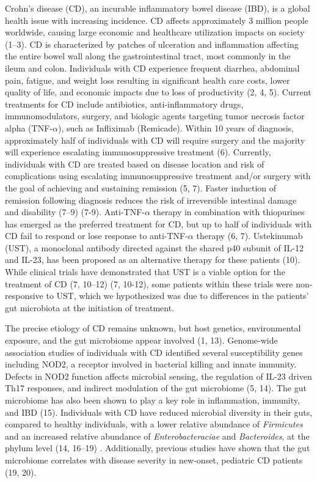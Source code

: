 \documentclass[11pt,]{article}
\begin{document}
Crohn's disease (CD), an incurable inflammatory bowel disease (IBD), is
a global health issue with increasing incidence. CD affects
approximately 3 million people worldwide, causing large economic and
healthcare utilization impacts on society (1--3). CD is characterized by
patches of ulceration and inflammation affecting the entire bowel wall
along the gastrointestinal tract, most commonly in the ileum and colon.
Individuals with CD experience frequent diarrhea, abdominal pain,
fatigue, and weight loss resulting in significant health care costs,
lower quality of life, and economic impacts due to loss of productivity
(2, 4, 5). Current treatments for CD include antibiotics,
anti-inflammatory drugs, immunomodulators, surgery, and biologic agents
targeting tumor necrosis factor alpha (TNF-\({\alpha}\)), such as
Infliximab (Remicade). Within 10 years of diagnosis, approximately half
of individuals with CD will require surgery and the majority will
experience escalating immunosuppressive treatment (6). Currently,
individuals with CD are treated based on disease location and risk of
complications using escalating immunosuppressive treatment and/or
surgery with the goal of achieving and sustaining remission (5, 7).
Faster induction of remission following diagnosis reduces the risk of
irreversible intestinal damage and disability (7--9) (7-9).
Anti-TNF-\({\alpha}\) therapy in combination with thiopurines has
emerged as the preferred treatment for CD, but up to half of individuals
with CD fail to respond or lose response to anti-TNF-\({\alpha}\)
therapy (6, 7). Ustekinumab (UST), a monoclonal antibody directed
against the shared p40 subunit of IL-12 and IL-23, has been proposed as
an alternative therapy for these patients (10). While clinical trials
have demonstrated that UST is a viable option for the treatment of CD
(7, 10--12) (7, 10-12), some patients within these trials were
non-responsive to UST, which we hypothesized was due to differences in
the patients' gut microbiota at the initiation of treatment.

The precise etiology of CD remains unknown, but host genetics,
environmental exposure, and the gut microbiome appear involved (1, 13).
Genome-wide association studies of individuals with CD identified
several susceptibility genes including NOD2, a receptor involved in
bacterial killing and innate immunity. Defects in NOD2 function affects
microbial sensing, the regulation of IL-23 driven Th17 responses, and
indirect modulation of the gut microbiome (5, 14). The gut microbiome
has also been shown to play a key role in inflammation, immunity, and
IBD (15). Individuals with CD have reduced microbial diversity in their
guts, compared to healthy individuals, with a lower relative abundance
of \emph{Firmicutes} and an increased relative abundance of
\emph{Enterobacteraciae} and \emph{Bacteroides}, at the phylum level
(14, 16--19) . Additionally, previous studies have shown that the gut
microbiome correlates with disease severity in new-onset, pediatric CD
patients (19, 20).
\end{document}
